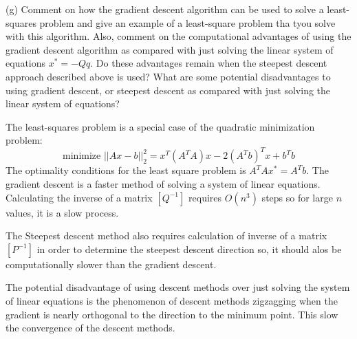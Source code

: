 (g) Comment on how the gradient descent algorithm can be used to
    solve a least-squares problem and give an example of a least-square
    problem tha tyou solve with this algorithm. Also, comment on the
    computational advantages of using the gradient descent algorithm
    as compared with just solving the linear system of equations
    $x^{*} = -Q q$. Do these advantages remain when the steepest descent
    approach described above is used? What are some potential disadvantages
    to using gradient descent, or steepest descent as compared with just
    solving the linear system of equations?
    
    The least-squares problem is a special case of the quadratic minimization problem:
    \[
    \mbox{minimize } \vert \vert Ax - b \vert \vert^{2}_{2} = x^{T} (A^{T} A)x - 2(A^{T}b)^{T} x + b^{T}b
    \]
    The optimality conditions for the least square problem is $A^{T} A x^{*} = A^{T}b$.
    The gradient descent is a faster method of solving a system of linear equations. Calculating the inverse of a matrix $[Q^{-1}]$ requires $O(n^{3})$ steps so for large $n$ values, it is a slow process.
    
    The Steepest descent method also requires calculation of inverse of a matrix $[P^{-1}]$ in order to determine the steepest descent direction so, it should alos be computationally slower than the gradient descent.
    
    The potential disadvantage of using descent methods over just solving the system of linear equations is the phenomenon of descent methods zigzagging when the gradient is nearly orthogonal to the direction to the minimum point. This slow the convergence of the descent methods.